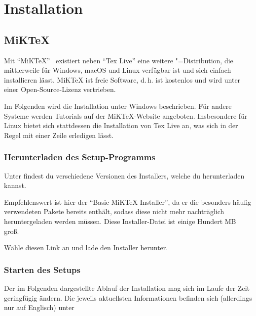 %
%

\chapter{Installation}
\label{sec:installation}

\section{MiKTeX}

Mit \enquote{MiKTeX}~\cite{MiKTeX} existiert neben \enquote{Tex Live} eine weitere \DMLLaTeX"=Distribution, die mittlerweile für Windows, macOS und Linux verfügbar ist und sich einfach installieren lässt.
MiKTeX ist freie Software, d.\,h. ist kostenlos und wird unter einer Open-Source-Lizenz vertrieben.

Im Folgenden wird die Installation unter Windows beschrieben. Für andere Systeme werden Tutorials auf der MiKTeX-Website angeboten. Insbesondere für Linux bietet sich stattdessen die Installation von Tex Live an, was sich in der Regel mit einer Zeile erledigen lässt.

\subsection{Herunterladen des Setup-Programms}

Unter 
findest du verschiedene Versionen des Installers, welche du herunterladen kannst.

Empfehlenswert ist hier der \enquote{Basic MiKTeX Installer}, da er die besonders häufig verwendeten Pakete bereits enthält, sodass diese nicht mehr nachträglich heruntergeladen werden müssen. Diese Installer-Datei ist einige Hundert MB groß.

Wähle diesen Link an und lade den Installer herunter.

\subsection{Starten des Setups}
Der im Folgenden dargestellte Ablauf der Installation mag sich im Laufe der Zeit geringfügig ändern. Die jeweils aktuellsten Informationen befinden sich (allerdings nur auf Englisch) unter

